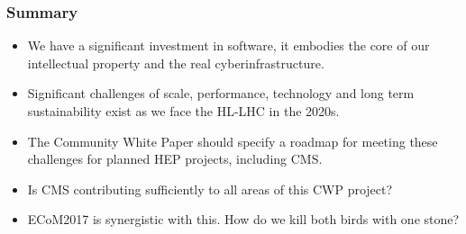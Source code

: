 \begin{frame}
\frametitle{Summary}

\begin{itemize}
\item We have a significant investment in software, it embodies the core of our intellectual property and the real cyberinfrastructure.
\item Significant challenges of scale, performance, technology and long term sustainability exist as we face the HL-LHC in the 2020s.
\item The Community White Paper should specify a roadmap for meeting these challenges for planned HEP projects, including CMS.
\item Is CMS contributing sufficiently to all areas of this CWP project?
\item ECoM2017 is synergistic with this. How do we kill both birds with one stone?
\end{itemize}

\end{frame}


